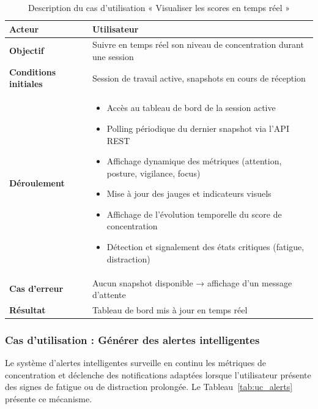 \begin{table}[H]
\centering
\renewcommand{\arraystretch}{1.2}
\begin{tabular}{|p{4cm}|p{10cm}|}
\hline
\textbf{Acteur} & Utilisateur \\ \hline

\textbf{Objectif} & Suivre en temps réel son niveau de concentration durant une session \\ \hline

\textbf{Conditions initiales} & Session de travail active, snapshots en cours de réception \\ \hline

\textbf{Déroulement} &
\begin{itemize}
    \item Accès au tableau de bord de la session active
    \item Polling périodique du dernier snapshot via l'API REST
    \item Affichage dynamique des métriques (attention, posture, vigilance, focus)
    \item Mise à jour des jauges et indicateurs visuels
    \item Affichage de l'évolution temporelle du score de concentration
    \item Détection et signalement des états critiques (fatigue, distraction)
\end{itemize} \\ \hline

\textbf{Cas d'erreur} & Aucun snapshot disponible → affichage d'un message d'attente \\ \hline

\textbf{Résultat} & Tableau de bord mis à jour en temps réel \\ \hline
\end{tabular}
\caption{Description du cas d'utilisation « Visualiser les scores en temps réel »}
\label{tab:uc_realtime}
\end{table}

\subsubsection{Cas d'utilisation : Générer des alertes intelligentes}

Le système d'alertes intelligentes surveille en continu les métriques de concentration et déclenche des notifications adaptées lorsque l'utilisateur présente des signes de fatigue ou de distraction prolongée. Le Tableau~\ref{tab:uc_alerts} présente ce mécanisme.

